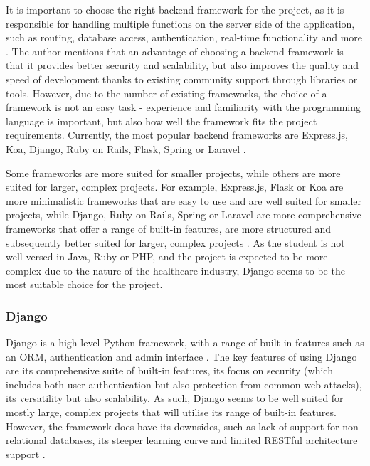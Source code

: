 It is important to choose the right backend framework for the project, as it is responsible for handling multiple functions on the server side of the application, such as routing, database access, authentication, real-time functionality and more \parencite{backend}. The author mentions that an advantage of choosing a backend framework is that it provides better security and scalability, but also improves the quality and speed of development thanks to existing community support through libraries or tools. However, due to the number of existing frameworks, the choice of a framework is not an easy task - experience and familiarity with the programming language is important, but also how well the framework fits the project requirements. Currently, the most popular backend frameworks are Express.js, Koa, Django, Ruby on Rails, Flask, Spring or Laravel \parencite{backend}. 

Some frameworks are more suited for smaller projects, while others are more suited for larger, complex projects. For example, Express.js, Flask or Koa are more minimalistic frameworks that are easy to use and are well suited for smaller projects, while Django, Ruby on Rails, Spring or Laravel are more comprehensive frameworks that offer a range of built-in features, are more structured and subsequently better suited for larger, complex projects \parencite{backend}. As the student is not well versed in Java, Ruby or PHP, and the project is expected to be more complex due to the nature of the healthcare industry, Django seems to be the most suitable choice for the project.

\subsubsection{Django}

Django is a high-level Python framework, with a range of built-in features such as an ORM, authentication and admin interface \parencite{django}. The key features of using Django are its comprehensive suite of built-in features, its focus on security (which includes both user authentication but also protection from common web attacks), its versatility but also scalability. As such, Django seems to be well suited for mostly large, complex projects that will utilise its range of built-in features. However, the framework does have its downsides, such as lack of support for non-relational databases, its steeper learning curve and limited RESTful architecture support \parencite{pythonframwork}. 

